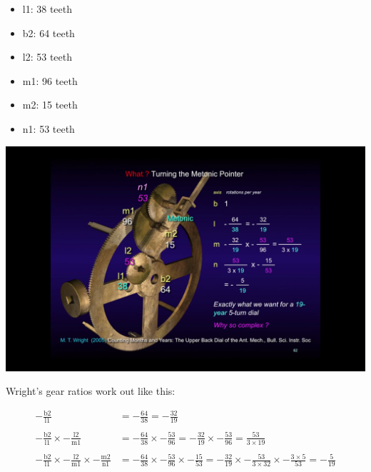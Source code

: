 \documentclass[11pt, oneside]{article}   	%
\theoremstyle{definition}
\begin{document}
\bigskip
\begin{minipage}[c]{0.45\textwidth}
  \begin{itemize}
      \item l1: 38 teeth
      \item b2: 64 teeth
      \item l2: 53 teeth
      \item m1: 96 teeth
      \item m2: 15 teeth
      \item n1: 53 teeth
  \end{itemize}
\end{minipage}
\hfill
\begin{minipage}[c]{0.60\textwidth}
  \includegraphics[width=\textwidth,cfbox=red]{images/turning_the_metonic_pointer_wright.png}
\end{minipage}

\bigskip
\bigskip
\noindent
Wright's  gear ratios work out like this:

\bigskip
\begin{equation*}
\begin{array}{lllll}
- \frac{\text{b2}}{\text{l1}} &= - \frac{64}{38} = - \frac{32}{19}                                                                                                                                                              \\ \\
-\frac{\text{b2}}{\text{l1}} \times -\frac{\text{l2}}{\text{m1}} &= - \frac{64}{38} \times - \frac{53}{96} = - \frac{32}{19} \times - \frac{53}{96} = \frac{53}{3 \times 19}  \\ \\
- \frac{\text{b2}}{\text{l1}} \times -\frac{\text{l2}}{\text{m1}} \times - \frac{\text{m2}}{\text{n1}} &= - \frac{64}{38} \times - \frac{53}{96} \times - \frac{15}{53} 
=  -\frac{32}{19} \times - \frac{53}{3 \times 32} \times - \frac{3 \times 5}{53} = - \frac{5}{19}
\end{array}
\end{equation*}
\end{document}
